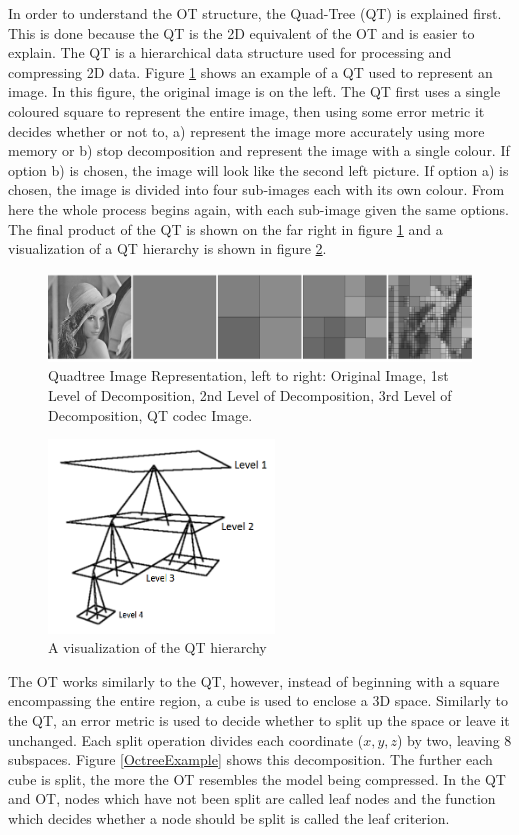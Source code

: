 In order to understand the OT structure, the Quad-Tree (QT) is explained first. This is done because the QT is the 2D equivalent of the OT and is easier to explain. The QT is a hierarchical data structure used for processing and compressing 2D data. Figure \ref{QuadtreeExample} shows an example of a QT used to represent an image. In this figure, the original image is on the left. The QT first uses a single coloured square to represent the entire image, then using some error metric it decides whether or not to, a) represent the image more accurately using more memory or b) stop decomposition and represent the image with a single colour. If option b) is chosen, the image will look like the second left picture. If option a) is chosen, the image is divided into four sub-images each with its own colour. From here the whole process begins again, with each sub-image given the same options. The final product of the QT is shown on the far right in figure \ref{QuadtreeExample} and a visualization of a QT hierarchy is shown in figure \ref{QuadTreeHierarchy}.
\begin{figure}[!h]
\centering
\includegraphics[width=12cm]{images/ch2/quadtreeexample}
\caption{Quadtree Image Representation, left to right: Original Image, 1st Level of Decomposition, 2nd Level of Decomposition, 3rd Level of Decomposition, QT codec Image.}
\label{QuadtreeExample}
\end{figure}
\begin{figure}[!h]
\centering
\includegraphics[width=6cm]{images/ch2/QuadTreeHierarchy}
\caption{A visualization of the QT hierarchy}
\label{QuadTreeHierarchy}
\end{figure}

The OT works similarly to the QT, however, instead of beginning with a square encompassing the entire region, a cube is used to enclose a 3D space. Similarly to the QT, an error metric is used to decide whether to split up the space or leave it unchanged. Each split operation divides each coordinate ($x,y,z$) by two, leaving 8 subspaces. Figure \ref{OctreeExample} shows this decomposition. The further each cube is split, the more the OT resembles the model being compressed. In the QT and OT, nodes which have not been split are called leaf nodes and the function which decides whether a node should be split is called the leaf criterion. 

